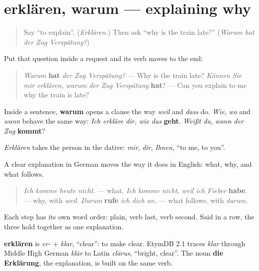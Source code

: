 \section[erklären, warum …]{erklären, warum — explaining why}

\label{lesson:GE-C255-erklaeren}



\begin{quote}
Say \textquotedblleft{}to explain\textquotedblright{}. (\emph{Erklären.}) Then ask \textquotedblleft{}why is the train late?\textquotedblright{} (\emph{Warum hat der Zug Verspätung?})
\end{quote}

\begin{grammarlens}[title={Grammar Lens: a question inside a sentence}]
Put that question inside a request and its verb moves to the end:

\begin{quote}
\emph{Warum} \textbf{hat} \emph{der Zug Verspätung?} — Why is the train late? \emph{Können Sie mir erklären, warum der Zug Verspätung} \textbf{hat}? — Can you explain to me why the train is late?
\end{quote}

Inside a sentence, \textbf{warum} opens a clause the way \emph{weil} and \emph{dass} do. \emph{Wie}, \emph{wo} and \emph{wann} behave the same way: \emph{Ich erkläre dir, wie das} \textbf{geht}. \emph{Weißt du, wann der Zug} \textbf{kommt}?

\emph{Erklären} takes the person in the dative: \emph{mir}, \emph{dir}, \emph{Ihnen}, \textquotedblleft{}to me, to you\textquotedblright{}.
\end{grammarlens}

\begin{culture}
A clear explanation in German moves the way it does in English: what, why, and what follows.

\begin{quote}
\emph{Ich komme heute nicht.} — what. \emph{Ich komme nicht, weil ich Fieber} \textbf{habe}. — why, with \emph{weil}. \emph{Darum} \textbf{rufe} \emph{ich dich an.} — what follows, with \emph{darum}.
\end{quote}

Each step has its own word order: plain, verb last, verb second. Said in a row, the three hold together as one explanation.
\end{culture}

\begin{cousinweb}
\textbf{erklären} is \emph{er-} + \emph{klar}, \textquotedblleft{}clear\textquotedblright{}: to make clear. EtymDB 2.1 traces \emph{klar} through Middle High German \emph{klār} to Latin \emph{clārus}, \textquotedblleft{}bright, clear\textquotedblright{}. The noun \textbf{die Erklärung}, the explanation, is built on the same verb.
\end{cousinweb}

